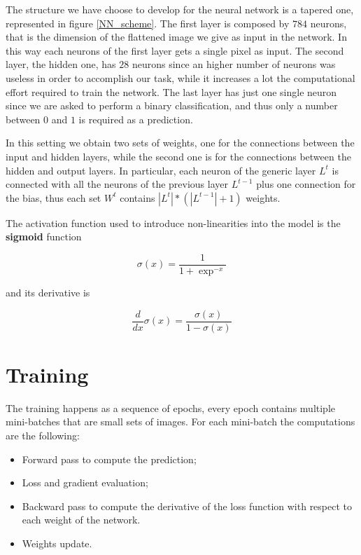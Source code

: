 \documentclass[a4paper,11pt,oneside]{book}
\begin{document}
The structure we have choose to develop for the neural network is a tapered one, represented in figure \ref{NN_scheme}. 
The first layer is composed by $784$ neurons, that is the dimension of the flattened image we give as input in the network. In this way each neurons of the first layer gets a single pixel as input. The second layer, the hidden one, has $28$ neurons since an higher number of neurons was useless in order to accomplish our task, while it increases a lot the computational effort required to train the network. The last layer has just one single neuron since we are asked to perform a binary classification, and thus only a number between $0$ and $1$ is required as a prediction.

\bigskip
In this setting we obtain two sets of weights, one for the connections between the input and hidden layers, while the second one is for the connections between the hidden and output layers. In particular, each neuron of the generic layer $L^t$ is connected with all the neurons of the previous layer $L^{t-1}$ plus one connection for the bias, thus each set $W^t$ contains $|L^t| * (|L^{t-1}| + 1)$ weights.

\bigskip
The activation function used to introduce non-linearities into the model is the \textbf{sigmoid} function

\begin{equation}
\sigma(x) = \frac{1}{1 + \exp^{-x}}
\end{equation}

and its derivative is

\begin{equation}
\frac{d}{dx}\sigma(x) = \frac{\sigma(x)}{1 - \sigma(x)}
\end{equation}



\section{Training}
The training happens as a sequence of epochs, every epoch contains multiple mini-batches that are small sets of images. For each mini-batch the computations are the following:

\begin{itemize}
    \item Forward pass to compute the prediction;
    \item Loss and gradient evaluation;
    \item Backward pass to compute the derivative of the loss function with respect to each weight of the network.
    \item Weights update.
\end{itemize}
\end{document}

